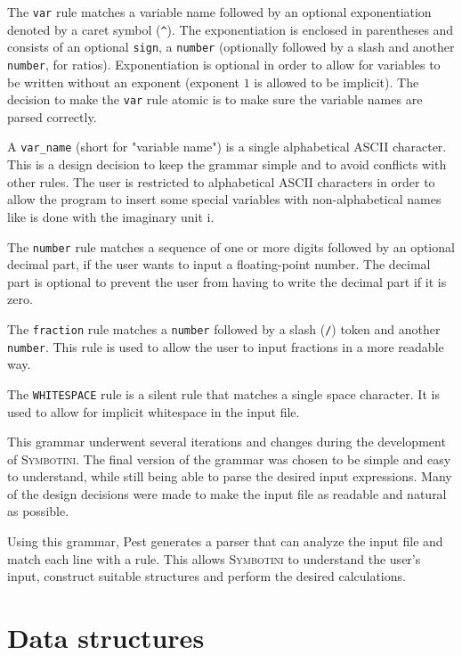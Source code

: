 The \verb|var| rule matches a variable name followed by an optional exponentiation denoted by a caret symbol (\verb|^|). The exponentiation is enclosed in parentheses and consists of an optional \verb|sign|, a \verb|number| (optionally followed by a slash and another \verb|number|, for ratios). Exponentiation is optional in order to allow for variables to be written without an exponent (exponent $1$ is allowed to be implicit). The decision to make the \verb|var| rule atomic is to make sure the variable names are parsed correctly.

A \verb|var_name| (short for "variable name") is a single alphabetical ASCII character. This is a design decision to keep the grammar simple and to avoid conflicts with other rules. The user is restricted to alphabetical ASCII characters in order to allow the program to insert some special variables with non-alphabetical names like is done with the imaginary unit $\mathrm{i}$.

The \verb|number| rule matches a sequence of one or more digits followed by an optional decimal part, if the user wants to input a floating-point number. The decimal part is optional to prevent the user from having to write the decimal part if it is zero.

The \verb|fraction| rule matches a \verb|number| followed by a slash (\verb|/|) token and another \verb|number|. This rule is used to allow the user to input fractions in a more readable way.

The \verb|WHITESPACE| rule is a silent rule that matches a single space character. It is used to allow for implicit whitespace in the input file.

This grammar underwent several iterations and changes during the development of \textsc{Symbotini}. The final version of the grammar was chosen to be simple and easy to understand, while still being able to parse the desired input expressions. Many of the design decisions were made to make the input file as readable and natural as possible.

Using this grammar, Pest generates a parser that can analyze the input file and match each line with a rule. This allows \textsc{Symbotini} to understand the user's input, construct suitable structures and perform the desired calculations.

\section{Data structures}\label{sec:data-structures}

